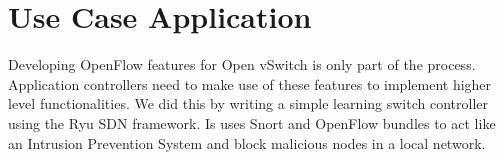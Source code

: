 
\chapter{Use Case Application}
\label{chapter:app}

Developing OpenFlow features for Open vSwitch is only part of the process. Application controllers need to make
use of these features to implement higher level functionalities. We did this by writing a simple learning
switch controller using the Ryu\cite{ryu} SDN framework. Is uses Snort and OpenFlow bundles to act like an Intrusion
Prevention System and block malicious nodes in a local network.

